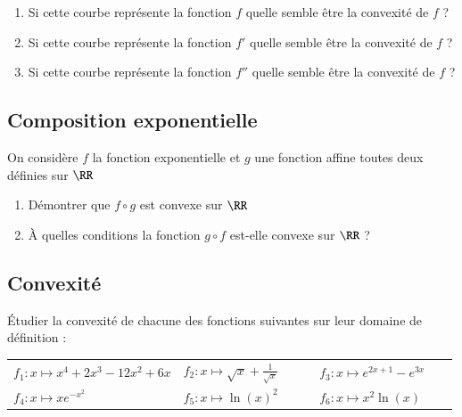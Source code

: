 \documentclass[oneside,12pt]{article}          %
\begin{document}
\begin{minipage}{0.55\linewidth}
\end{minipage}
\begin{minipage}{0.45\linewidth}
	\begin{enumerate}
		\item Si cette courbe représente la fonction $f$ quelle semble être la convexité de $f$ ?
		\item Si cette courbe représente la fonction $f'$ quelle semble être la convexité de $f$ ?
		\item Si cette courbe représente la fonction $f''$ quelle semble être la convexité de $f$ ?
	\end{enumerate}
\end{minipage}




\subsection{Composition exponentielle}
On considère $f$ la fonction exponentielle et $g$ une fonction affine toutes deux définies sur $\RR$
\begin{enumerate}
	\item Démontrer que $f \circ g$ est convexe sur $\RR$
	\item À quelles conditions la fonction $g \circ f$ est-elle convexe sur $\RR$ ?
\end{enumerate}



\subsection{Convexité}
Étudier la convexité de chacune des fonctions suivantes sur leur domaine de définition :

\begin{tabular}{p{0.33\linewidth} p{0.33\linewidth} p{0.33\linewidth}}
	$f_1:x\mapsto x^4+2x^3-12x^2+6x$ & $f_2:x\mapsto \sqrt{x} + \frac{1}{\sqrt{x}}$ & $f_3:x\mapsto e^{2x+1}-e^{3x}$ \\
	$f_4:x\mapsto xe^{-x^2}$ & $f_5:x\mapsto \ln(x)^2$ & $f_6:x\mapsto x^2\ln(x)$
\end{tabular}
\end{document}
